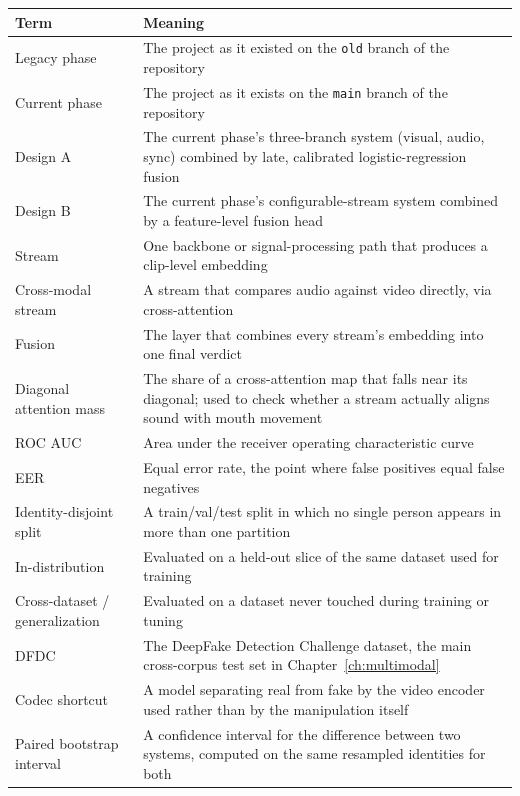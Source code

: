 \begin{tabularx}{\textwidth}{@{}>{\raggedright\arraybackslash}p{3.8cm}X@{}}
    \toprule
    \textbf{Term} & \textbf{Meaning} \\
    \midrule
    Legacy phase       & The project as it existed on the \texttt{old} branch of the repository \\
    Current phase      & The project as it exists on the \texttt{main} branch of the repository \\
    Design A           & The current phase's three-branch system (visual, audio, sync) combined by late, calibrated logistic-regression fusion \\
    Design B           & The current phase's configurable-stream system combined by a feature-level fusion head \\
    Stream             & One backbone or signal-processing path that produces a clip-level embedding \\
    Cross-modal stream & A stream that compares audio against video directly, via cross-attention \\
    Fusion             & The layer that combines every stream's embedding into one final verdict \\
    Diagonal attention mass & The share of a cross-attention map that falls near its diagonal; used to check whether a stream actually aligns sound with mouth movement \\
    ROC AUC            & Area under the receiver operating characteristic curve \\
    EER                & Equal error rate, the point where false positives equal false negatives \\
    Identity-disjoint split & A train/val/test split in which no single person appears in more than one partition \\
    In-distribution    & Evaluated on a held-out slice of the same dataset used for training \\
    Cross-dataset / generalization & Evaluated on a dataset never touched during training or tuning \\
    DFDC               & The DeepFake Detection Challenge dataset, the main cross-corpus test set in Chapter~\ref{ch:multimodal} \\
    Codec shortcut     & A model separating real from fake by the video encoder used rather than by the manipulation itself \\
    Paired bootstrap interval & A confidence interval for the difference between two systems, computed on the same resampled identities for both \\

\end{tabularx}
